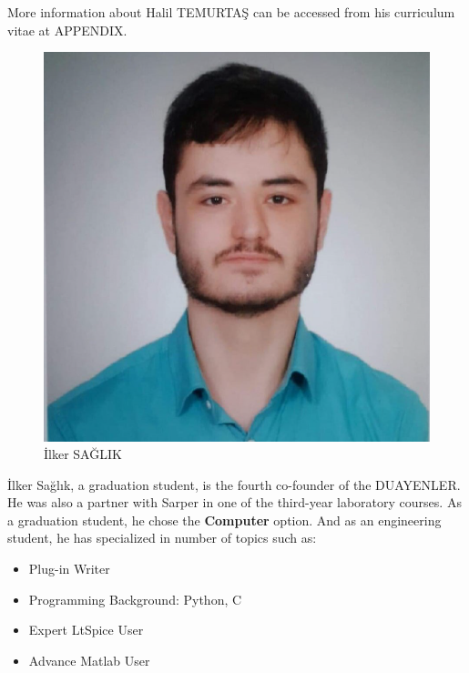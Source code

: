 \documentclass[a4paper,12pt]{article}
\begin{document}
More information about Halil TEMURTAŞ can be accessed from his curriculum vitae at APPENDIX.\\[0.4cm]


\begin{minipage}{0.38\textwidth}
\begin{flushleft}

\begin{figure}[H]
	\center
	\setlength{\unitlength}{\textwidth} 
	\includegraphics[width=0.7\unitlength]{images/ilker_foto}
	\caption{\label{fig:ilker_foto} \small İlker SAĞLIK }
\end{figure}


\end{flushleft}
\end{minipage}
\begin{minipage}{0.61\textwidth}
\begin{flushleft}

	İlker Sağlık, a graduation student, is the fourth co-founder of the DUAYENLER. He was also a partner with Sarper in one of the third-year laboratory courses. As a graduation student, he chose the \textbf{Computer} option. And as an engineering student, he has specialized in number of topics such as:
		
\begin{itemize}
	\item Plug-in Writer 
	\item Programming Background: Python, C 
	\item Expert LtSpice User
	\item Advance Matlab User
\end{itemize}

\end{flushleft} 
\end{minipage}\\[0.4cm]
\end{document}
